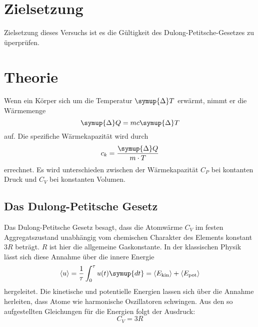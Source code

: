 \section{Zielsetzung}
Zielsetzung dieses Versuchs ist es die Gültigkeit des Dulong-Petitsche-Gesetzes zu üperprüfen.
\section{Theorie}
\label{sec:Theorie}
Wenn ein Körper sich um die Temperatur $\symup{\Delta} T$ erwärmt, nimmt er die Wärmemenge
\begin{equation}
\symup{\Delta} Q = m c \symup{\Delta} T
\end{equation}
auf.
Die spezifiche Wärmekapazität wird durch
\begin{equation}
c_k = \frac{\symup{\Delta} Q}{m \cdot T}
\end{equation}
errechnet.
Es wird unterschieden zwischen der Wärmekapazität $C_P$ bei kontanten Druck und $C_V$ bei konstanten Volumen.
\subsection{Das Dulong-Petitsche Gesetz}
Das Dulong-Petitsche Gesetz besagt, dass die Atomwärme $C_V$ im festen Aggregatszustand
unabhängig vom chemischen Charakter des Elements konstant $3R$ beträgt.
$R$ ist hier die allgemeine Gaskonstante.
In der klassischen Physik lässt sich diese Annahme über die innere Energie
 \begin{equation}
 \langle u \rangle = \frac{1}{\tau} \int_0^\tau u(t)\symup{dt} = \langle E_\text{kin} \rangle + \langle
E_\text{pot} \rangle
 \end{equation}
hergeleitet.
Die kinetische und potentielle Energien lassen sich über die Annahme herleiten, dass Atome
wie harmonische Oszillatoren schwingen.
Aus den so aufgestellten Gleichungen für die Energien folgt der Ausdruck:
\begin{equation}
\label{eqn:peitsche}
C_V = 3R
\end{equation}
